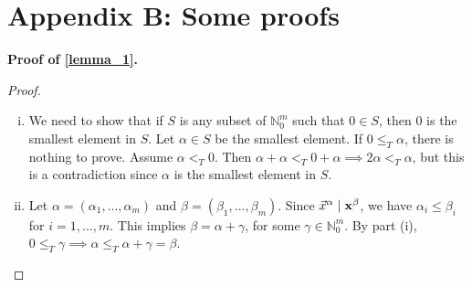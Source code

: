\documentclass[12pt]{article}
\renewcommand{\vec}[1]{\textup{\textbf{#1}}}
\theoremstyle{definition}
\theoremstyle{definition}
\theoremstyle{definition}
\theoremstyle{plain}
\theoremstyle{plain}
\numberwithin{equation}{section}
\begin{document}
\newpage
\section*{Appendix B: Some proofs}
\noindent\textbf{Proof of \cref{lemma_1}.}
\begin{proof}\hfill
    \begin{enumerate}[(i)]
        \item We need to show that if $S$ is any subset of $\mathbb{N}_0^m$ such that $0 \in S$, then $0$ is the smallest element in $S$. 
        Let $\alpha \in S$ be the smallest element. 
        If $0 \leqslant_T \alpha$, there is nothing to prove. 
        Assume $\alpha <_T 0$. Then $\alpha + \alpha <_T 0 + \alpha \implies 2\alpha <_T \alpha$, but this is a contradiction since $\alpha$ is the smallest element in $S$.
        
        \item Let $\alpha = (\alpha_1, ..., \alpha_m)$ and $\beta = (\beta_1, ..., \beta_m)$. 
        Since $\Vec{x}^\alpha \mid \vec{x}^\beta$, we have $\alpha_i \leqslant \beta_i$ for $i = 1, ..., m$. 
        This implies $\beta = \alpha + \gamma$, for some $\gamma \in \mathbb{N}_0^m$. 
        By part (i), $0 \leqslant_T \gamma \implies \alpha \leqslant_T \alpha + \gamma = \beta$.
    \end{enumerate}
\end{proof}
\end{document}
